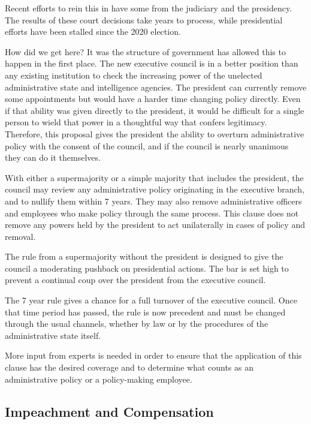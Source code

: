 \documentclass{article}
\begin{document}
Recent efforts to rein this in have some from the judiciary\cite{Crowell} and the presidency\cite{ScheduleF}. The results of these court decisions take years to process, while presidential efforts have been stalled since the 2020 election.

How did we get here? It was the structure of government has allowed this to happen in the first place. The new executive council is in a better position than any existing institution to check the increasing power of the unelected administrative state and intelligence agencies. The president can currently remove some appointments but would have a harder time changing policy directly\cite{Fairlie}. Even if that ability was given directly to the president, it would be difficult for a single person to wield that power in a thoughtful way that confers legitimacy. Therefore, this proposal gives the president the ability to overturn administrative policy with the consent of the council, and if the council is nearly unanimous they can do it themselves.

\begin{quoting}
With either a supermajority or a simple majority that includes the president, the council may review any administrative policy originating in the executive branch, and to nullify them within 7 years. They may also remove administrative officers and employees who make policy through the same process. This clause does not remove any powers held by the president to act unilaterally in cases of policy and removal.
\end{quoting}

The rule from a supermajority without the president is designed to give the council a moderating pushback on presidential actions. The bar is set high to prevent a continual coup over the president from the executive council.

The 7 year rule gives a chance for a full turnover of the executive council. Once that time period has passed, the rule is now precedent and must be changed through the usual channels, whether by law or by the procedures of the administrative state itself.

More input from experts is needed in order to ensure that the application of this clause has the desired coverage and to determine what counts as an administrative policy or a policy-making employee.

\subsection{Impeachment and Compensation}
\end{document}
